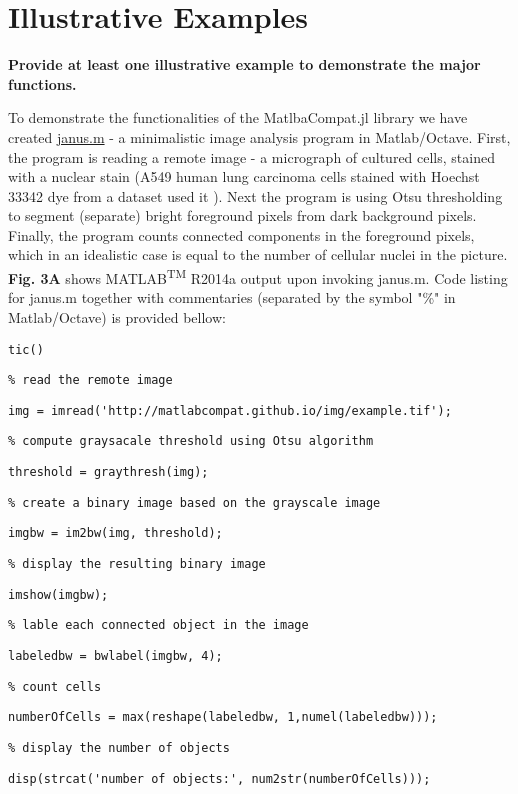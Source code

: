 \section{Illustrative Examples}
\label{} 

\textbf{Provide at least one illustrative example to demonstrate the major functions.}

To demonstrate the functionalities of the MatlbaCompat.jl library we have created \href{https://github.com/MatlabCompat/MatlabCompat.jl/blob/dev/test/janus.m}{janus.m} - a minimalistic image analysis program in Matlab/Octave. First, the program is reading a remote image - a micrograph of cultured cells, stained with a nuclear stain (A549 human lung carcinoma cells stained with Hoechst 33342 dye from a dataset used it \cite{22787215}). Next the program is using Otsu \cite{otsu1975threshold} thresholding to segment (separate) bright foreground pixels from dark background pixels. Finally, the program counts connected components in the foreground pixels, which in an idealistic case is equal to the number of cellular nuclei in the picture. \textbf{Fig. 3A} shows MATLAB\textsuperscript{TM} R2014a output upon invoking janus.m. Code listing for janus.m together with commentaries (separated by the symbol "\%" in Matlab/Octave) is provided bellow:

\verb|tic()|

\verb|% read the remote image|

\verb|img = imread('http://matlabcompat.github.io/img/example.tif');|

\verb|% compute graysacale threshold using Otsu algorithm|

\verb|threshold = graythresh(img);|

\verb|% create a binary image based on the grayscale image|

\verb|imgbw = im2bw(img, threshold);|

\verb|% display the resulting binary image|

\verb|imshow(imgbw);|

\verb|% lable each connected object in the image|

\verb|labeledbw = bwlabel(imgbw, 4);|

\verb|% count cells|

\verb|numberOfCells = max(reshape(labeledbw, 1,numel(labeledbw)));|

\verb|% display the number of objects|

\verb|disp(strcat('number of objects:', num2str(numberOfCells)));|

